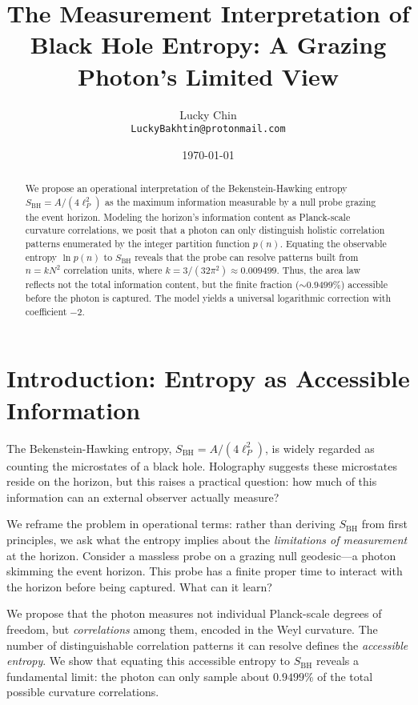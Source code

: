 \documentclass[12pt, letterpaper]{article}
\title{The Measurement Interpretation of Black Hole Entropy: A Grazing Photon's Limited View}
\author{Lucky Chin \\ \normalsize \texttt{LuckyBakhtin@protonmail.com}}
\date{\today}
\begin{document}
\maketitle

\begin{abstract}
We propose an operational interpretation of the Bekenstein-Hawking entropy $S_{\mathrm{BH}} = A/(4\ell_P^2)$ as the maximum information measurable by a null probe grazing the event horizon. Modeling the horizon's information content as Planck-scale curvature correlations, we posit that a photon can only distinguish holistic correlation patterns enumerated by the integer partition function $p(n)$. Equating the observable entropy $\ln p(n)$ to $S_{\mathrm{BH}}$ reveals that the probe can resolve patterns built from $n = k N^2$ correlation units, where $k = 3/(32\pi^2) \approx 0.009499$. Thus, the area law reflects not the total information content, but the finite fraction ($\sim 0.9499\%$) accessible before the photon is captured. The model yields a universal logarithmic correction with coefficient $-2$.
\end{abstract}

\section{Introduction: Entropy as Accessible Information}

The Bekenstein-Hawking entropy, $S_{\mathrm{BH}} = A/(4\ell_P^2)$, is widely regarded as counting the microstates of a black hole. Holography suggests these microstates reside on the horizon, but this raises a practical question: how much of this information can an external observer actually measure?

We reframe the problem in operational terms: rather than deriving $S_{\mathrm{BH}}$ from first principles, we ask what the entropy implies about the \emph{limitations of measurement} at the horizon. Consider a massless probe on a grazing null geodesic—a photon skimming the event horizon. This probe has a finite proper time to interact with the horizon before being captured. What can it learn?

We propose that the photon measures not individual Planck-scale degrees of freedom, but \emph{correlations} among them, encoded in the Weyl curvature. The number of distinguishable correlation patterns it can resolve defines the \emph{accessible entropy}. We show that equating this accessible entropy to $S_{\mathrm{BH}}$ reveals a fundamental limit: the photon can only sample about $0.9499\%$ of the total possible curvature correlations.
\end{document}
